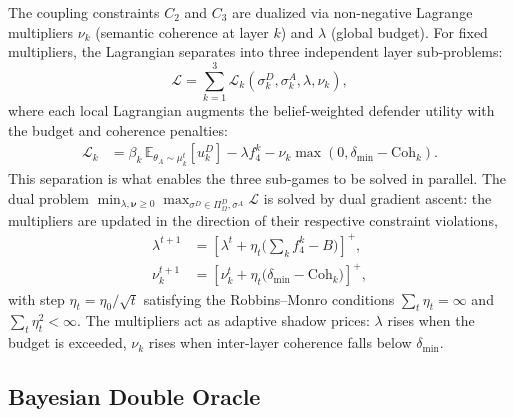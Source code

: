 \documentclass[conference]{IEEEtran}
\newcommand{\E}{\mathbb{E}}
\newcommand{\Coh}{\mathrm{Coh}}
\begin{document}
The coupling constraints $C_2$ and $C_3$ are dualized via non-negative Lagrange
multipliers $\nu_k$ (semantic coherence at layer $k$) and $\lambda$ (global
budget). For fixed multipliers, the Lagrangian separates into three independent
layer sub-problems:
\begin{equation}
\mathcal{L} = \sum_{k=1}^3 \mathcal{L}_k(\sigma_k^D,\sigma_k^A,\lambda,\nu_k),
\label{eq:lagrangian}
\end{equation}
where each local Lagrangian augments the belief-weighted defender utility with
the budget and coherence penalties:
\begin{align}
\mathcal{L}_k &= \beta_k\,\E_{\theta_A\sim\mu_k^t}\!\left[u_k^D\right]
- \lambda f_4^k
- \nu_k\max\!\left(0, \delta_{\min}-\Coh_k\right).
\end{align}
This separation is what enables the three sub-games to be solved in parallel.
The dual problem
$\min_{\lambda,\boldsymbol{\nu}\geq0}\max_{\sigma^D\in\Pi^D_\Omega,\sigma^A}
\mathcal{L}$ is solved by dual gradient ascent: the multipliers are updated in
the direction of their respective constraint violations,
\begin{align}
\lambda^{t+1} &= \left[\lambda^t + \eta_t\Big(\textstyle\sum_k f_4^k - B\Big)
\right]^+,\\
\nu_k^{t+1} &= \left[\nu_k^t + \eta_t\big(\delta_{\min}-\Coh_k\big)\right]^+,
\end{align}
with step $\eta_t=\eta_0/\sqrt{t}$ satisfying the Robbins--Monro conditions
$\sum_t\eta_t=\infty$ and $\sum_t\eta_t^2<\infty$. The multipliers act as
adaptive shadow prices: $\lambda$ rises when the budget is exceeded, $\nu_k$
rises when inter-layer coherence falls below $\delta_{\min}$.

\subsection{Bayesian Double Oracle}
\end{document}
